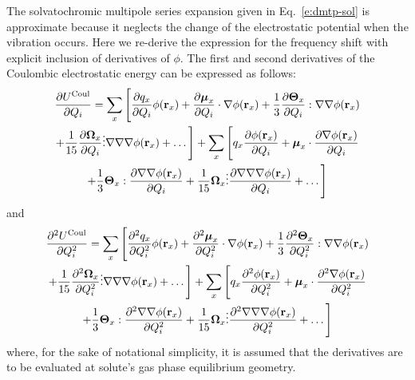 \documentclass[a4paper,titlepage,twoside,fleqn,12pt]{book}
\newcommand{\BM}[1]{\ensuremath{\mbox{\boldmath${#1}$}}}
\newcommand{\fderiv}[2]{\ensuremath{
\frac{\partial #1}{\partial #2}}}
\newcommand{\sderiv}[2]{\ensuremath{
\frac{\partial^2 #1}{\partial #2^2}
}}
\begin{document}
\begin{refsection}
The solvatochromic multipole series expansion given in Eq.~\eqref{e:dmtp-sol}
is approximate because it neglects the change of the electrostatic
potential when the vibration occurs. Here we re\hyp{}derive the 
expression for the frequency shift with explicit inclusion of derivatives
of $\phi$. The first and second derivatives of the Coulombic
electrostatic energy can be expressed as follows\citep{Blasiak.Cho.JCP.2014}:
%
\begin{multline} \label{x:726439}
 \fderiv{U^{\rm Coul}}{Q_i} =
%
\sum_x 
\Bigg[ 
  \fderiv{q_x}{Q_i} \phi({\bf r}_x) + 
  \fderiv{{\BM \mu}_x}{Q_i} \cdot \nabla \phi({\bf r}_x) + \frac{1}{3}  
  \fderiv{{\BM \Theta}_x}{Q_i} : \nabla\nabla \phi({\bf r}_x) \\ + \frac{1}{15}   
  \fderiv{{\BM \Omega}_x}{Q_i} \vdots \nabla\nabla\nabla \phi({\bf r}_x) + \ldots 
\Bigg] 
%
+
%
\sum_x 
\Bigg[ 
  q_x \fderiv{\phi({\bf r}_x)}{Q_i} + 
  {\BM \mu}_x \cdot \fderiv{\nabla \phi({\bf r}_x)}{Q_i} \\ + \frac{1}{3} 
  {\BM \Theta}_x : \fderiv{\nabla\nabla \phi({\bf r}_x)}{Q_i} + \frac{1}{15}
  {\BM \Omega}_x \vdots \fderiv{\nabla\nabla\nabla \phi({\bf r}_x)}{Q_i} + \ldots 
\Bigg]
\end{multline}
%
and
%
\begin{multline} \label{x:726440}
 \sderiv{U^{\rm Coul}}{Q_i} =
%
\sum_x 
\Bigg[ 
  \sderiv{q_x}{Q_i} \phi({\bf r}_x) + 
  \sderiv{{\BM \mu}_x}{Q_i} \cdot \nabla \phi({\bf r}_x) + \frac{1}{3}  
  \sderiv{{\BM \Theta}_x}{Q_i} : \nabla\nabla \phi({\bf r}_x) \\ + \frac{1}{15}   
  \sderiv{{\BM \Omega}_x}{Q_i} \vdots \nabla\nabla\nabla \phi({\bf r}_x) + \ldots 
\Bigg] 
%
+
%
\sum_x 
\Bigg[ 
  q_x \sderiv{\phi({\bf r}_x)}{Q_i} + 
  {\BM \mu}_x \cdot \sderiv{\nabla \phi({\bf r}_x)}{Q_i} \\ + \frac{1}{3} 
  {\BM \Theta}_x : \sderiv{\nabla\nabla \phi({\bf r}_x)}{Q_i} + \frac{1}{15}
  {\BM \Omega}_x \vdots \sderiv{\nabla\nabla\nabla \phi({\bf r}_x)}{Q_i} + \ldots 
\Bigg]
\end{multline}
%
where, for the sake of notational simplicity, 
it is assumed that the derivatives are to be evaluated at
solute's gas phase equilibrium geometry.


\end{refsection}
\end{document}
